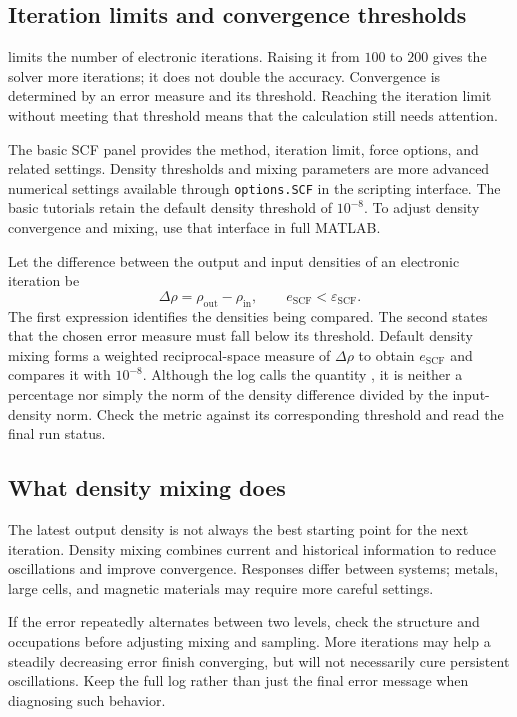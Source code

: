 \subsection{Iteration limits and convergence thresholds}

 limits the number of electronic iterations. Raising it from $100$ to $200$ gives the solver more iterations; it does not double the accuracy. Convergence is determined by an error measure and its threshold. Reaching the iteration limit without meeting that threshold means that the calculation still needs attention.

The basic SCF panel provides the method, iteration limit, force options, and related settings. Density thresholds and mixing parameters are more advanced numerical settings available through \texttt{options.SCF} in the scripting interface. The basic tutorials retain the default density threshold of $10^{-8}$. To adjust density convergence and mixing, use that interface in full MATLAB\regmark{}.

Let the difference between the output and input densities of an electronic iteration be
\begin{equation}
  \Delta\rho=\rho_{\mathrm{out}}-\rho_{\mathrm{in}},
  \qquad e_{\mathrm{SCF}}<\varepsilon_{\mathrm{SCF}}.
  \label{eq:scf-stopping}
\end{equation}
The first expression identifies the densities being compared. The second states that the chosen error measure must fall below its threshold. Default density mixing forms a weighted reciprocal-space measure of $\Delta\rho$ to obtain $e_{\mathrm{SCF}}$ and compares it with $10^{-8}$. Although the log calls the quantity , it is neither a percentage nor simply the norm of the density difference divided by the input-density norm. Check the metric against its corresponding threshold and read the final run status.

\subsection{What density mixing does}

The latest output density is not always the best starting point for the next iteration. Density mixing combines current and historical information to reduce oscillations and improve convergence. Responses differ between systems; metals, large cells, and magnetic materials may require more careful settings.

If the error repeatedly alternates between two levels, check the structure and occupations before adjusting mixing and sampling. More iterations may help a steadily decreasing error finish converging, but will not necessarily cure persistent oscillations. Keep the full log rather than just the final error message when diagnosing such behavior.

